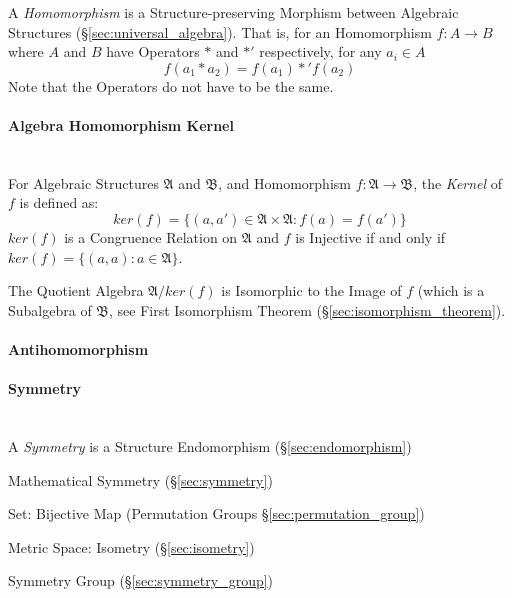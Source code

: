 
A \emph{Homomorphism} is a Structure-preserving Morphism between
Algebraic Structures (\S\ref{sec:universal_algebra}). That is, for
an Homomorphism $f : A \rightarrow B$ where $A$ and $B$ have Operators
$*$ and $*'$ respectively, for any $a_i \in A$
\[
  f(a_1 * a_2) = f(a_1) *' f(a_2)
\]
\fist Note that the Operators do not have to be the same.



\paragraph{Algebra Homomorphism Kernel}
\label{sec:algebra_homomorphism_kernel} \hfill \\

For Algebraic Structures $\mathfrak{A}$ and $\mathfrak{B}$, and
Homomorphism $f: \mathfrak{A} \rightarrow \mathfrak{B}$, the
\emph{Kernel} of $f$ is defined as:
\[
    ker(f) = \{ (a,a') \in \mathfrak{A} \times \mathfrak{A} : f(a) = f(a') \}
\]
$ker(f)$ is a Congruence Relation on $\mathfrak{A}$ and $f$ is Injective if and
only if $ker(f) = \{(a,a) : a \in \mathfrak{A}\}$.

The Quotient Algebra $\mathfrak{A}/ker(f)$ is Isomorphic to the Image
of $f$ (which is a Subalgebra of $\mathfrak{B}$, see First Isomorphism
Theorem (\S\ref{sec:isomorphism_theorem}).



\paragraph{Antihomomorphism}\label{sec:antihomomorphism}

\paragraph{Symmetry}\label{sec:structure_symmetry}
\hfill \\

A \emph{Symmetry} is a Structure Endomorphism
(\S\ref{sec:endomorphism})

Mathematical Symmetry (\S\ref{sec:symmetry})

Set: Bijective Map (Permutation Groups \S\ref{sec:permutation_group})

Metric Space: Isometry (\S\ref{sec:isometry})

Symmetry Group (\S\ref{sec:symmetry_group})



